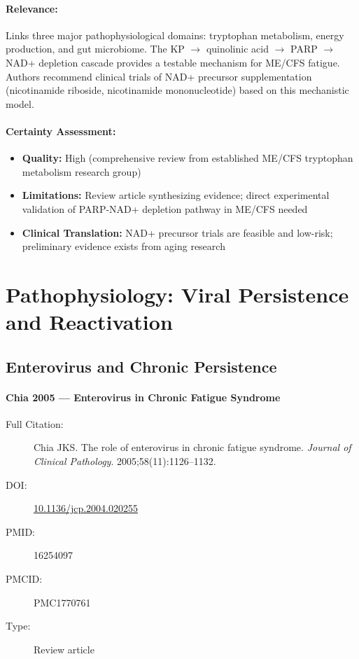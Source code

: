 \paragraph{Relevance:}
Links three major pathophysiological domains: tryptophan metabolism, energy production, and gut microbiome. The KP $\rightarrow$ quinolinic acid $\rightarrow$ PARP $\rightarrow$ NAD+ depletion cascade provides a testable mechanism for ME/CFS fatigue. Authors recommend clinical trials of NAD+ precursor supplementation (nicotinamide riboside, nicotinamide mononucleotide) based on this mechanistic model.

\paragraph{Certainty Assessment:}
\begin{itemize}
    \item \textbf{Quality:} High (comprehensive review from established ME/CFS tryptophan metabolism research group)
    \item \textbf{Limitations:} Review article synthesizing evidence; direct experimental validation of PARP-NAD+ depletion pathway in ME/CFS needed
    \item \textbf{Clinical Translation:} NAD+ precursor trials are feasible and low-risk; preliminary evidence exists from aging research
\end{itemize}

\section{Pathophysiology: Viral Persistence and Reactivation}
\label{sec:bib-viral}

\subsection{Enterovirus and Chronic Persistence}

\paragraph{Chia 2005 --- Enterovirus in Chronic Fatigue Syndrome}

\begin{description}
    \item[Full Citation:] Chia JKS. The role of enterovirus in chronic fatigue syndrome. \textit{Journal of Clinical Pathology}. 2005;58(11):1126--1132.
    \item[DOI:] \href{https://doi.org/10.1136/jcp.2004.020255}{10.1136/jcp.2004.020255}
    \item[PMID:] 16254097
    \item[PMCID:] PMC1770761
    \item[Type:] Review article
\end{description}

